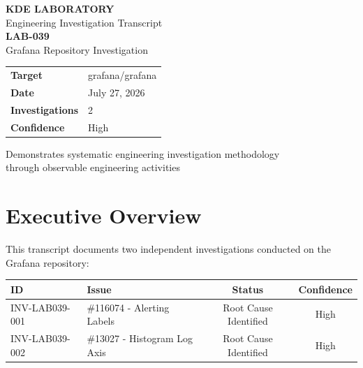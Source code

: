 \documentclass[
    11pt,
    a4paper,
    oneside,
    parskip=full,
    headings=big,
    bibliography=totoc
]{scrartcl}
\begin{document}
\thispagestyle{empty}
\vspace*{2cm}

{\LARGE\bfseries\color{black}KDE LABORATORY}\\[0.5cm]
{\Large\color{black50}Engineering Investigation Transcript}\\[2cm]

{\Huge\bfseries\color{black}LAB-039}\\[0.3cm]
{\Large\color{black50}Grafana Repository Investigation}\\[3cm]

\begingroup
\centering
\begin{tabular}{p{3cm}p{9cm}}
    \toprule
    \textbf{Target} & grafana/grafana \\
    \textbf{Date} & July 27, 2026 \\
    \textbf{Investigations} & 2 \\
    \textbf{Confidence} & High \\
    \bottomrule
\end{tabular}
\endgroup

\vfill

{\small\color{black50}Demonstrates systematic engineering investigation methodology\\
through observable engineering activities}

\newpage

\tableofcontents
\newpage
{}

\section{Executive Overview}

This transcript documents two independent investigations conducted on the Grafana repository:

\vspace{0.5cm}
\begingroup
\addtolength{\tabcolsep}{4pt}
\begin{tabular}{|l|p{6cm}|c|c|}
    \hline
    \rowcolor{black10}
    \textbf{ID} & \textbf{Issue} & \textbf{Status} & \textbf{Confidence} \\
    \hline
    INV-LAB039-001 & \#116074 - Alerting Labels & Root Cause Identified & High \\
    INV-LAB039-002 & \#13027 - Histogram Log Axis & Root Cause Identified & High \\
    \hline
\end{tabular}
\endgroup
\vspace{0.5cm}
\end{document}
